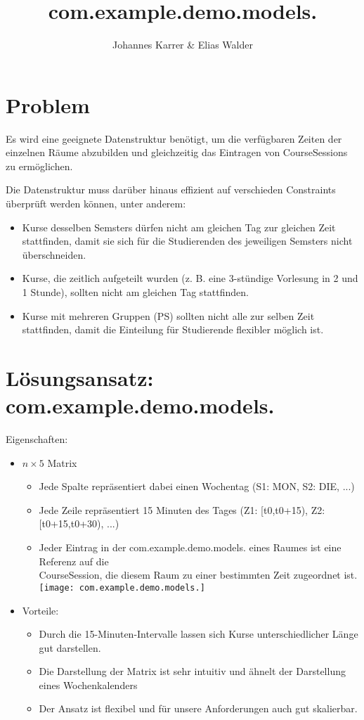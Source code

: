 \documentclass{article}
\title{com.example.demo.models.}
\author{Johannes Karrer \& Elias Walder}
\begin{document}
	\maketitle
	\section{Problem}
	Es wird eine geeignete Datenstruktur benötigt, um die verfügbaren Zeiten der einzelnen Räume abzubilden und gleichzeitig das Eintragen von CourseSessions zu ermöglichen.
	
	Die Datenstruktur muss darüber hinaus effizient auf verschieden Constraints überprüft werden können, unter anderem:
	
	\begin{itemize}
		\item Kurse desselben Semsters dürfen nicht am gleichen Tag zur gleichen Zeit stattfinden, damit sie sich für die Studierenden des jeweiligen Semsters nicht überschneiden.
		\item Kurse, die zeitlich aufgeteilt wurden (z. B. eine 3-stündige Vorlesung in 2 und 1 Stunde), sollten nicht am gleichen Tag stattfinden.
		\item Kurse mit mehreren Gruppen (PS) sollten nicht alle zur selben Zeit stattfinden, damit die Einteilung für Studierende flexibler möglich ist.
	\end{itemize}
	
	\section{Lösungsansatz: com.example.demo.models.}
	
	
	Eigenschaften:
	\begin{itemize}
		\item $n \times 5$ Matrix
		\begin{itemize}
			\item Jede Spalte repräsentiert dabei einen Wochentag (S1: MON, S2: DIE, ...)
			\item Jede Zeile repräsentiert 15 Minuten des Tages (Z1: [t0,t0+15), Z2: [t0+15,t0+30), ...)
			\item Jeder Eintrag in der com.example.demo.models. eines Raumes ist eine Referenz auf die\\ CourseSession, die diesem Raum zu einer bestimmten Zeit zugeordnet ist.\\
			\texttt{[image: com.example.demo.models.]}
		\end{itemize}
		\item Vorteile:
		\begin{itemize}
			\item Durch die 15-Minuten-Intervalle lassen sich Kurse unterschiedlicher Länge gut darstellen.
			\item Die Darstellung der Matrix ist sehr intuitiv und ähnelt der Darstellung eines Wochenkalenders
			\item Der Ansatz ist flexibel und für unsere Anforderungen auch gut skalierbar.
		\end{itemize}
	\end{itemize}
\end{document}
